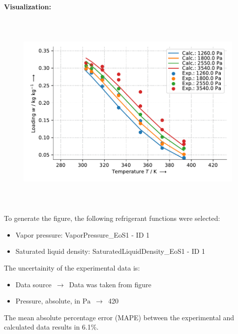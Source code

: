 \textbf{Visualization:}
%
\begin{figure}[!htp]
{\noindent\includegraphics[height=10cm, keepaspectratio]{figs/ads/ads_Ethanol_activated_carbon_COC-L1200_DubininAstakhov_1.pdf}}
\end{figure}
%

To generate the figure, the following refrigerant functions were selected:
\begin{itemize}
\item Vapor pressure: VaporPressure\_EoS1 - ID 1
\item Saturated liquid density: SaturatedLiquidDensity\_EoS1 - ID 1
\end{itemize}

The uncertainity of the experimental data is:
\begin{itemize}
\item Data source $\,\to\,$ Data was taken from figure
\item Pressure, absolute, in $\si{\pascal}$ $\,\to\,$ 420
\end{itemize}

The mean absolute percentage error (MAPE) between the experimental and calculated data results in 6.1\%.
\FloatBarrier
\newpage
